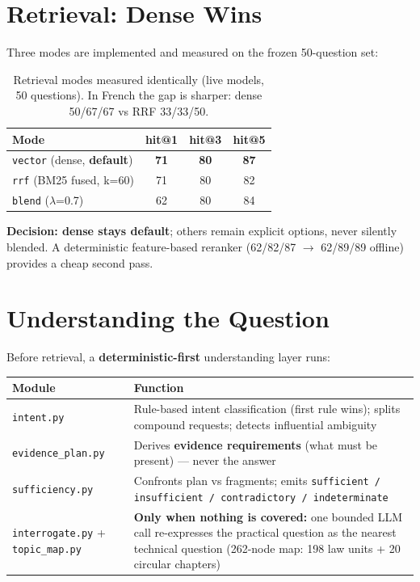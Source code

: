 \documentclass[a4paper,12pt]{report}
\begin{document}
\section{Retrieval: Dense Wins}

Three modes are implemented and measured on the frozen 50-question set:

\begin{table}[H]
\centering\small
\begin{tabular}{lccc}
\toprule
\textbf{Mode} & \textbf{hit@1} & \textbf{hit@3} & \textbf{hit@5} \\
\midrule
\texttt{vector} (dense, \textbf{default}) & \textbf{71} & \textbf{80} & \textbf{87} \\
\texttt{rrf} (BM25 fused, k=60) & 71 & 80 & 82 \\
\texttt{blend} ($\lambda$=0.7) & 62 & 80 & 84 \\
\bottomrule
\end{tabular}
\caption{Retrieval modes measured identically (live models, 50 questions). In French the gap is sharper: dense 50/67/67 vs RRF 33/33/50.}
\end{table}

\noindent\textbf{Decision: dense stays default}; others remain explicit options, never silently blended. A deterministic feature-based reranker (62/82/87 $\rightarrow$ 62/89/89 offline) provides a cheap second pass.

\section{Understanding the Question}

Before retrieval, a \textbf{deterministic-first} understanding layer runs:

\begin{table}[H]
\centering\footnotesize
\begin{tabular}{p{3.6cm}p{10.2cm}}
\toprule
\textbf{Module} & \textbf{Function} \\
\midrule
\texttt{intent.py} & Rule-based intent classification (first rule wins); splits compound requests; detects influential ambiguity \\
\texttt{evidence\_plan.py} & Derives \textbf{evidence requirements} (what must be present) --- never the answer \\
\texttt{sufficiency.py} & Confronts plan vs fragments; emits \texttt{sufficient / insufficient / contradictory / indeterminate} \\
\texttt{interrogate.py} + \texttt{topic\_map.py} & \textbf{Only when nothing is covered:} one bounded LLM call re-expresses the practical question as the nearest technical question (262-node map: 198 law units + 20 circular chapters) \\
\bottomrule
\end{tabular}
\end{table}
\end{document}
